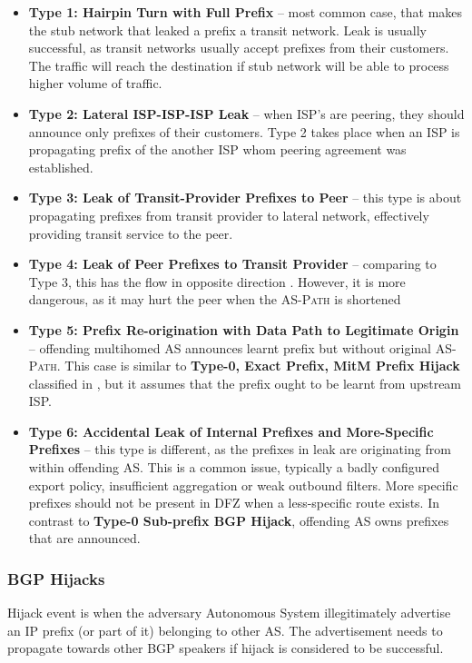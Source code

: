 \begin{itemize}
    \item \textbf{Type 1: Hairpin Turn with Full Prefix} -- most common case, that makes the stub network that leaked a prefix a transit network. Leak is usually successful, as transit networks usually accept prefixes from their customers. The traffic will reach the destination if stub network will be able to process higher volume of traffic. 
    \item \textbf{Type 2: Lateral ISP-ISP-ISP Leak} -- when ISP's are peering, they should announce only prefixes of their customers. Type 2 takes place when an ISP is propagating prefix of the another ISP whom peering agreement was established.
    \item \textbf{Type 3: Leak of Transit-Provider Prefixes to Peer} -- this type is about propagating prefixes from transit provider to lateral network, effectively providing transit service to the peer.
    \item \textbf{Type 4: Leak of Peer Prefixes to Transit Provider} -- comparing to Type 3, this has the flow in opposite direction . However, it is more dangerous, as it may hurt the peer when the \textsc{AS-Path} is shortened 
    \item \textbf{Type 5: Prefix Re-origination with Data Path to Legitimate Origin} -- offending multihomed AS announces learnt prefix but without original \textsc{AS-Path}. This case is similar to \textbf{Type-0, Exact Prefix, MitM Prefix Hijack} classified in \cite{Sermpezis2018a}, but it assumes that the prefix ought to be learnt from upstream ISP. 
    \item \textbf{Type 6: Accidental Leak of Internal Prefixes and More-Specific Prefixes} -- this type is different, as the prefixes in leak are originating from within offending AS. This is a common issue, typically a badly configured export policy, insufficient aggregation or weak outbound filters. More specific prefixes should not be present in DFZ when a less-specific route exists. In contrast to \textbf{Type-0 Sub-prefix BGP Hijack}, offending AS owns prefixes that are announced.  
\end{itemize}

\subsubsection{BGP Hijacks}
\label{def:tax:hj}
Hijack event is when the adversary Autonomous System illegitimately advertise an IP prefix (or part of it) belonging to other AS. The advertisement needs to propagate towards other BGP speakers if hijack is considered to be successful.

